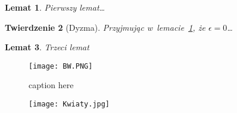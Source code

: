 \documentclass[a4paper,11pt]{article}
\newtheorem{twr}{Twierdzenie}
\newtheorem{lem}[twr]{Lemat}
\begin{document}
\begin{lem} Pierwszy
lemat\dots\label{lem:1} \end{lem}
\begin{twr}[Dyzma]
Przyjmując w~lemacie~\ref{lem:1},
że $\epsilon=0$\dots \end{twr}
\begin{lem}Trzeci lemat\end{lem}

\begin{figure}[hbt!]
  \centering
  \texttt{[image: BW.PNG]}
  \caption{caption here}
  \label{fig:vue-snoc-pos}
\end{figure}
\FloatBarrier


\begin{figure}
\centering
\texttt{[image: Kwiaty.jpg]}
\end{figure}
\end{document}

